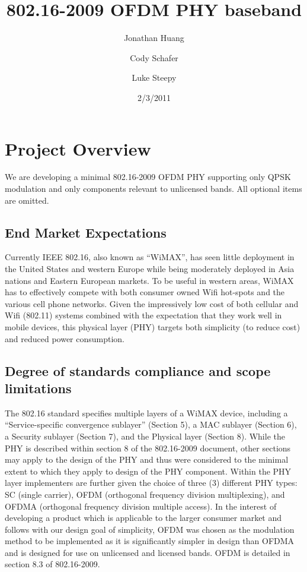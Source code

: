 \documentclass[10pt]{article}
\title{802.16-2009 OFDM PHY baseband}
\author{Jonathan Huang \and Cody Schafer \and Luke Steepy}
\date{2/3/2011}
\begin{document}
\maketitle
\section{Project Overview}
We are developing a minimal 802.16-2009 OFDM PHY supporting only QPSK
modulation and only components relevant to unlicensed bands. All
optional items are omitted.

	\subsection{End Market Expectations}
	Currently IEEE 802.16, also known as ``WiMAX'', has seen little deployment in the
	United States and western Europe while being moderately deployed in Asia
	nations and Eastern European markets. To be useful in western areas, WiMAX has
	to effectively compete with both consumer owned Wifi hot-spots and the various
	cell phone networks. Given the impressively low cost of both cellular and Wifi
	(802.11) systems combined with the expectation that they work well in mobile
	devices, this physical layer (PHY) targets both simplicity (to reduce cost) and
	reduced power consumption.

	\subsection{Degree of standards compliance and scope limitations}
	The 802.16 standard specifies multiple layers of a WiMAX device, including a
	``Service-specific convergence sublayer'' (Section 5), a MAC sublayer (Section
	6), a Security sublayer (Section 7), and the Physical layer (Section 8). While
	the PHY is described within section 8 of the 802.16-2009 document, other
	sections may apply to the design of the PHY and thus were considered to the
	minimal extent to which they apply to design of the PHY component.  Within the
	PHY layer implementers are further given the choice of three (3) different PHY
	types: SC (single carrier), OFDM (orthogonal frequency division multiplexing),
	and OFDMA (orthogonal frequency division multiple access). In the interest of
	developing a product which is applicable to the larger consumer market and
	follows with our design goal of simplicity, OFDM was chosen as the modulation
	method to be implemented as it is significantly simpler in design than OFDMA
	and is designed for use on unlicensed and licensed bands. OFDM is detailed in
	section 8.3 of 802.16-2009.
\end{document}

